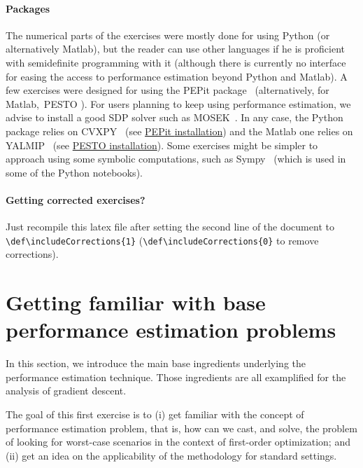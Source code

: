 \documentclass[11pt,a4paper]{article}
\def\includeCorrections{1} %
\newcommand{\pesto}{{PESTO }}
\newcommand{\pepit}{{PEPit }}
\begin{document}
\paragraph{Packages} The numerical parts of the exercises were mostly done for using Python (or alternatively Matlab), but the reader can use other languages if he is proficient with semidefinite programming with it (although there is currently no interface for easing the access to performance estimation beyond Python and Matlab). A few exercises were designed for using the \pepit package~\cite{goujaud2022pepit} (alternatively, for Matlab,~\pesto\cite{pesto2017}). For users planning to keep using performance estimation, we advise to install a good SDP solver such as MOSEK~\cite{mosek2010}. In any case, the Python package relies on CVXPY~\cite{diamond2016cvxpy} (see \href{https://github.com/PerformanceEstimation/PEPit}{\pepit installation}) and the Matlab one relies on YALMIP~\cite{Yalmip2004} (see \href{https://github.com/PerformanceEstimation/Performance-Estimation-Toolbox/wiki/Toolbox-(and-dependencies)-installation}{\pesto installation}). Some exercises might be simpler to approach using some symbolic computations, such as Sympy~\cite{meurer2017sympy} (which is used in some of the Python notebooks). 

{\color{blue}\paragraph{Getting corrected exercises?} Just recompile this latex file after setting the second line of the document to \verb?\def\includeCorrections{1}? (\verb?\def\includeCorrections{0}? to remove corrections).}

	\section{Getting familiar with base performance estimation problems}	\label{s:pep_basis}	%
	In this section, we introduce the main base ingredients underlying the performance estimation technique. Those ingredients are all examplified for the analysis of gradient descent.
	
	The goal of this first exercise is to (i) get familiar with the concept of performance estimation problem, that is, how can we cast, and solve, the problem of looking for worst-case scenarios in the context of first-order optimization; and (ii) get an idea on the applicability of the methodology for standard settings.
	
\end{document}
